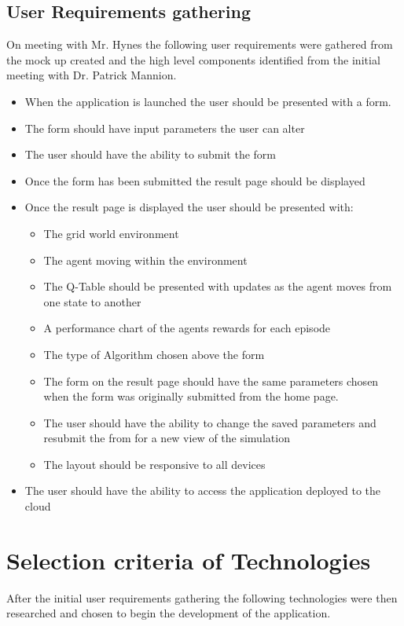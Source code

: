 \subsection {User Requirements gathering}
On meeting with Mr. Hynes the following user requirements were gathered from the mock up created and the high level components identified from the initial meeting with Dr. Patrick Mannion.
\begin{itemize}
	\item When the application is launched the user should be presented with a form.
	\item The form should have input parameters the user can alter
	\item The user should have the ability to submit the form
	\item Once the form has been submitted the result page should be displayed 
	\item Once the result page is displayed the user should be presented with:
	\begin{itemize}
		\item The grid world environment
		\item The agent moving within the environment
		\item The Q-Table should be presented with updates as the agent moves from one state to another
		\item A performance chart of the agents rewards for each episode 
		\item The type of Algorithm chosen above the form 
		\item The form on the result page should have the same parameters chosen when the form was originally submitted from the home page.
		\item The user should have the ability to change the saved parameters and resubmit the from for a new view of the simulation
		\item The layout should be responsive to all devices
		
	\end{itemize}
	\item The user should have the ability to access the application deployed to the cloud 
\end{itemize}
\section{Selection criteria of Technologies}
After the initial user requirements gathering the following technologies were then researched and chosen to begin the development of the application.

